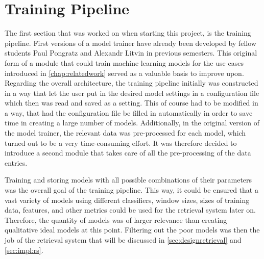 \section{Training Pipeline}

The first section that was worked on when starting this project, is the training pipeline. First versions of a model trainer have already been developed by fellow students Paul Pongratz and Alexandr Litvin in previous semesters. This original form of a module that could train machine learning models for the use cases introduced in \autoref{chap:relatedwork} served as a valuable basis to improve upon. Regarding the overall architecture, the training pipeline initially was constructed in a way that let the user put in the desired model settings in a configuration file which then was read and saved as a setting. This of course had to be modified in a way, that had the configuration file be filled in automatically in order to save time in creating a large number of models. Additionally, in the original version of the model trainer, the relevant data was pre-processed for each model, which turned out to be a very time-consuming effort. It was therefore decided to introduce a second module that takes care of all the pre-processing of the data entries. 

Training and storing models with all possible combinations of their parameters was the overall goal of the training pipeline. This way, it could be ensured that a vast variety of models using different classifiers, window sizes, sizes of training data, features, and other metrics could be used for the retrieval system later on. Therefore, the quantity of models was of larger relevance than creating qualitative ideal models at this point. Filtering out the poor models was then the job of the retrieval system that will be discussed in \autoref{sec:designretrieval} and \autoref{sec:impl:rs}.


